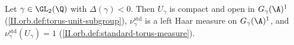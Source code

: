 Let $\gamma\in\GL_2(\Q)$ with $\Delta(\gamma)<0$. Then $U_\gamma$ is compact and open in $G_\gamma(\A)^1$ (\cref{II.orb.def:torus-unit-subgroup}), $\nu_\gamma^{\mathrm{std}}$ is a left Haar
measure on $G_\gamma(\A)^1$, and $\nu_\gamma^{\mathrm{std}}(U_\gamma)=1$ (\cref{II.orb.def:standard-torus-measure}).
